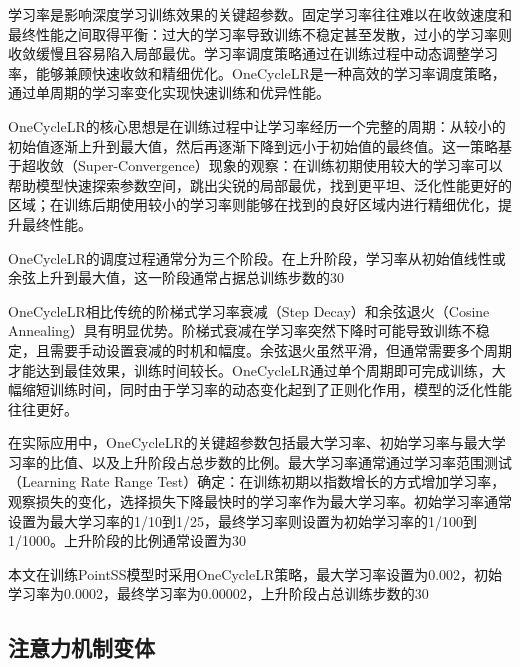 \documentclass[12pt,a4paper,openany,oneside]{ctexbook}
\theoremstyle{definition}
\theoremstyle{remark}
\begin{document}
学习率是影响深度学习训练效果的关键超参数。固定学习率往往难以在收敛速度和最终性能之间取得平衡：过大的学习率导致训练不稳定甚至发散，过小的学习率则收敛缓慢且容易陷入局部最优。学习率调度策略通过在训练过程中动态调整学习率，能够兼顾快速收敛和精细优化。OneCycleLR\cite{smith2019super}是一种高效的学习率调度策略，通过单周期的学习率变化实现快速训练和优异性能。

OneCycleLR的核心思想是在训练过程中让学习率经历一个完整的周期：从较小的初始值逐渐上升到最大值，然后再逐渐下降到远小于初始值的最终值。这一策略基于超收敛（Super-Convergence）现象的观察：在训练初期使用较大的学习率可以帮助模型快速探索参数空间，跳出尖锐的局部最优，找到更平坦、泛化性能更好的区域；在训练后期使用较小的学习率则能够在找到的良好区域内进行精细优化，提升最终性能。

OneCycleLR的调度过程通常分为三个阶段。在上升阶段，学习率从初始值线性或余弦上升到最大值，这一阶段通常占据总训练步数的30%

OneCycleLR相比传统的阶梯式学习率衰减（Step Decay）和余弦退火（Cosine Annealing）具有明显优势。阶梯式衰减在学习率突然下降时可能导致训练不稳定，且需要手动设置衰减的时机和幅度。余弦退火虽然平滑，但通常需要多个周期才能达到最佳效果，训练时间较长。OneCycleLR通过单个周期即可完成训练，大幅缩短训练时间，同时由于学习率的动态变化起到了正则化作用，模型的泛化性能往往更好。

在实际应用中，OneCycleLR的关键超参数包括最大学习率、初始学习率与最大学习率的比值、以及上升阶段占总步数的比例。最大学习率通常通过学习率范围测试（Learning Rate Range Test）确定：在训练初期以指数增长的方式增加学习率，观察损失的变化，选择损失下降最快时的学习率作为最大学习率。初始学习率通常设置为最大学习率的1/10到1/25，最终学习率则设置为初始学习率的1/100到1/1000。上升阶段的比例通常设置为30%

本文在训练PointSS模型时采用OneCycleLR策略，最大学习率设置为0.002，初始学习率为0.0002，最终学习率为0.00002，上升阶段占总训练步数的30%

\subsection{注意力机制变体}
\end{document}
